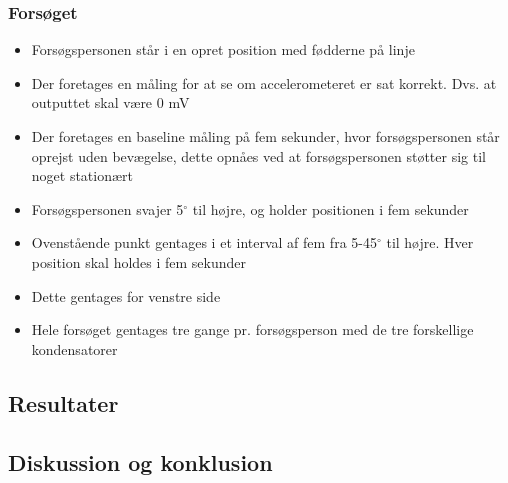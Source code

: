\subsubsection{Forsøget}
\begin{itemize}
\item Forsøgspersonen står i en opret position med fødderne på linje
\item Der foretages en måling for at se om accelerometeret er sat korrekt. Dvs. at outputtet skal være 0 mV
\item Der foretages en baseline måling på fem sekunder, hvor forsøgspersonen står oprejst uden bevægelse, dette opnåes ved at forsøgspersonen støtter sig til noget stationært
\item Forsøgspersonen svajer 5${^\circ}$ til højre, og holder positionen i fem sekunder
\item Ovenstående punkt gentages i et interval af fem fra 5-45${^\circ}$ til højre. Hver position skal holdes i fem sekunder
\item Dette gentages for venstre side
\item Hele forsøget gentages tre gange pr. forsøgsperson med de tre forskellige kondensatorer
\end{itemize}

\subsection{Resultater}

\subsection{Diskussion og konklusion}